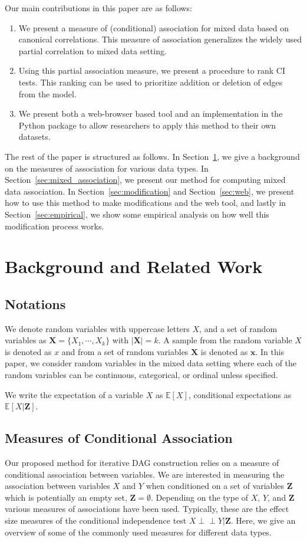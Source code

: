 \documentclass{uai2025} %
\def\ci{\perp\!\!\!\!\!\perp}
\begin{document}
Our main contributions in this paper are as follows:
\begin{enumerate}
	\item We present a measure of (conditional) association for mixed data
		based on canonical correlations. This measure of association
		generalizes the widely used partial correlation to mixed data
		setting.
	\item Using this partial association measure, we present a procedure to
		rank CI tests. This ranking can be used to prioritize addition
		or deletion of edges from the model.
	\item We present both a web-browser based tool and an implementation in
		the Python package to allow researchers to apply this method to
		their own datasets.
\end{enumerate}

The rest of the paper is structured as follows. In
Section~\ref{sec:background}, we give a background on the measures of
association for various data types. In Section~\ref{sec:mixed_association}, we
present our method for computing mixed data association. In
Section~\ref{sec:modification} and Section~\ref{sec:web}, we present how to use
this method to make modifications and the web tool, and lastly in
Section~\ref{sec:empirical}, we show some empirical analysis on how well this
modification process works.

\section{Background and Related Work}
\label{sec:background}
\subsection{Notations}
We denote random variables with uppercase letters $ X $, and a set of random
variables as $ \bm{X} = \{X_1, \cdots, X_k\} $ with $ \rvert \bm{X} \rvert = k
$. A sample from the random variable $ X $ is denoted as $ x $ and from a set
of random variables $ \bm{X} $ is denoted as $ \bm{x} $. In this paper, we
consider random variables in the mixed data setting where each of the random
variables can be continuous, categorical, or ordinal unless specified. 

We write the expectation of a variable $ X $ as $ \mathbb{E}[X] $, conditional
expectations as $ \mathbb{E}[X | \bm{Z}] $.

\subsection{Measures of Conditional Association}
Our proposed method for iterative DAG construction relies on a measure of
conditional association between variables. We are interested in measuring the
association between variables $ X $ and $ Y $ when conditioned on a set of
variables $ \bm{Z} $ which is potentially an empty set, $ \bm{Z} = \emptyset $.
Depending on the type of $ X $, $ Y $, and $ \bm{Z} $ various measures of
associations have been used. Typically, these are the effect size measures of
the conditional independence test $ X \ci Y \rvert \bm{Z} $. Here, we give an
overview of some of the commonly used measures for different data types.
\end{document}
